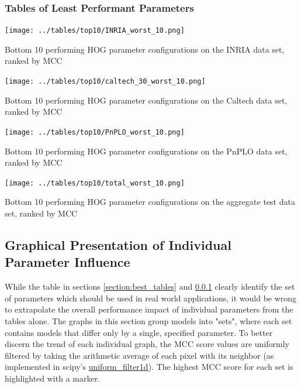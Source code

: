 \subsubsection{Tables of Least Performant Parameters}\label{section:worst_tables}

\begin{table}
    \centering
    \texttt{[image: ../tables/top10/INRIA\_worst\_10.png]}
    \caption{Bottom 10 performing HOG parameter configurations on the INRIA data set, ranked by MCC}
\end{table}

\begin{table}
    \centering
    \texttt{[image: ../tables/top10/caltech\_30\_worst\_10.png]}
    \caption{Bottom 10 performing HOG parameter configurations on the Caltech data set, ranked by MCC}
\end{table}

\begin{table}
    \centering
    \texttt{[image: ../tables/top10/PnPLO\_worst\_10.png]}
    \caption{Bottom 10 performing HOG parameter configurations on the PnPLO data set, ranked by MCC}
\end{table}

\begin{table}
    \centering
    \texttt{[image: ../tables/top10/total\_worst\_10.png]}
    \caption{Bottom 10 performing HOG parameter configurations on the aggregate test data set, ranked by MCC}
    \label{table:last_param_table}
\end{table}

\subsection{Graphical Presentation of Individual Parameter Influence}

While the table in sections \ref{section:best_tables} and \ref{section:worst_tables} clearly identify the set of parameters which should be used in real world applications, it would be wrong to extrapolate the overall performance impact of individual parameters from the tables alone. The graphs in this section group models into "sets", where each set contains models that differ only by a single, specified parameter. To better discern the trend of each individual graph, the MCC score values are uniformly filtered by taking the arithmetic average of each pixel with its neighbor (as implemented in scipy's \href{https://docs.scipy.org/doc/scipy/reference/generated/scipy.ndimage.uniform_filter1d.html}{uniform\_filter1d}). The highest MCC score for each set is highlighted with a marker.

